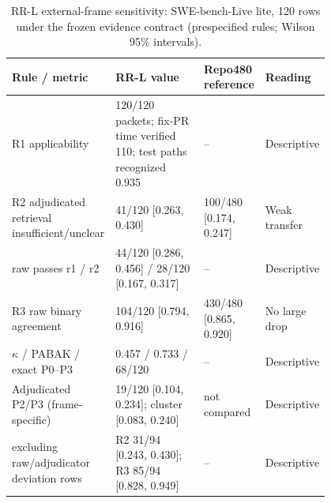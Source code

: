 \begin{table}[htbp]
\centering\scriptsize
\caption{RR-L external-frame sensitivity: SWE-bench-Live lite, 120 rows under the frozen evidence contract (prespecified rules; Wilson 95\% intervals).}
\label{tab:rrlexternal}
\setlength{\tabcolsep}{3pt}
\begin{tabular}{p{0.27\linewidth}p{0.36\linewidth}p{0.17\linewidth}l}
\toprule
Rule / metric & RR-L value & Repo480 reference & Reading \\
\midrule
R1 applicability & 120/120 packets; fix-PR time verified 110; test paths recognized 0.935 & -- & Descriptive \\
R2 adjudicated retrieval insufficient/unclear & 41/120 [0.263, 0.430] & 100/480 [0.174, 0.247] & Weak transfer \\
\quad raw passes r1 / r2 & 44/120 [0.286, 0.456] / 28/120 [0.167, 0.317] & -- & Descriptive \\
R3 raw binary agreement & 104/120 [0.794, 0.916] & 430/480 [0.865, 0.920] & No large drop \\
\quad $\kappa$ / PABAK / exact P0--P3 & 0.457 / 0.733 / 68/120 & -- & Descriptive \\
Adjudicated P2/P3 (frame-specific) & 19/120 [0.104, 0.234]; cluster [0.083, 0.240] & not compared & Descriptive \\
\quad excluding raw/adjudicator deviation rows & R2 31/94 [0.243, 0.430]; R3 85/94 [0.828, 0.949] & -- & Descriptive \\
\bottomrule
\end{tabular}
\end{table}
